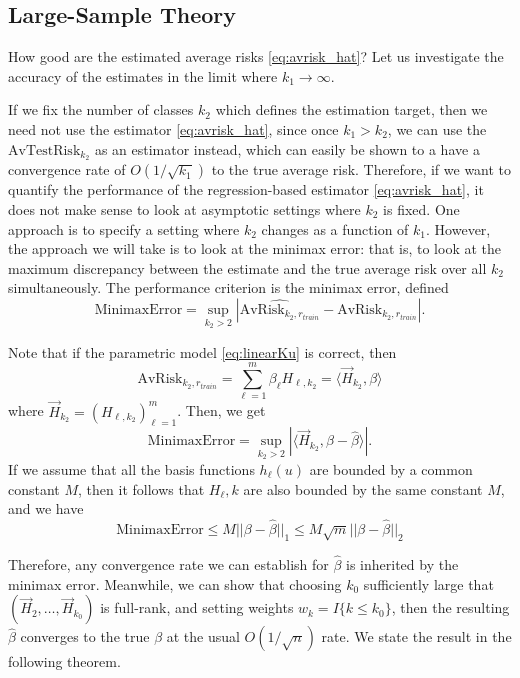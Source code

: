 \documentclass[12pt]{article}
\begin{document}
\subsection{Large-Sample Theory}

How good are the estimated average risks \eqref{eq:avrisk_hat}?  Let
us investigate the accuracy of the estimates in the limit where
$k_1 \to \infty$.

If we fix the number of classes $k_2$ which defines the estimation
target, then we need not use the estimator \eqref{eq:avrisk_hat},
since once $k_1 > k_2$, we can use the $\text{AvTestRisk}_{k_2}$ as an
estimator instead, which can easily be shown to a have a convergence
rate of $O(1/\sqrt{k_1})$ to the true average risk.  Therefore, if we
want to quantify the performance of the regression-based
estimator \eqref{eq:avrisk_hat}, it does not make sense to look at
asymptotic settings where $k_2$ is fixed.  One approach is to specify
a setting where $k_2$ changes as a function of $k_1$.  However, the
approach we will take is to look at the minimax error: that is, to
look at the maximum discrepancy between the estimate and the true
average risk over all $k_2$ simultaneously.  The performance criterion
is the minimax error, defined
\begin{equation}\label{eq:minimax_error}
\text{MinimaxError} = \sup_{k_2 > 2} |\widehat{\text{AvRisk}_{k_2,r_{train}}} - \text{AvRisk}_{k_2,r_{train}}|.
\end{equation}

Note that if the parametric model \eqref{eq:linearKu} is correct, then
\[
\text{AvRisk}_{k_2,r_{train}} = \sum_{\ell=1}^m \beta_\ell H_{\ell, k_2} = \langle \vec{H}_{k_2}, \beta \rangle
\]
where $\vec{H}_{k_2} = (H_{\ell, k_2})_{\ell=1}^m$.
Then, we get
\[
\text{MinimaxError} = \sup_{k_2 > 2} |\langle \vec{H}_{k_2}, \beta - \hat{\beta}\rangle|.
\]
If we assume that all the basis functions $h_\ell(u)$ are bounded by a
common constant $M$, then it follows that $H_\ell, k$ are also bounded by the same constant $M$,
and we have
\[
\text{MinimaxError} \leq M ||\beta - \hat{\beta}||_1 \leq M \sqrt{m}||\beta - \hat{\beta}||_2
\]

Therefore, any convergence rate we can establish for $\hat{\beta}$ is
inherited by the minimax error.  Meanwhile, we can show that choosing
$k_0$ sufficiently large that $(\vec{H}_2,\hdots,\vec{H}_{k_0})$ is
full-rank, and setting weights $w_k = I\{k \leq k_0\}$, then the
resulting $\hat{\beta}$ converges to the true $\beta$ at the usual
$O(1/\sqrt{n})$ rate.  We state the result in the following theorem.
\end{document}
